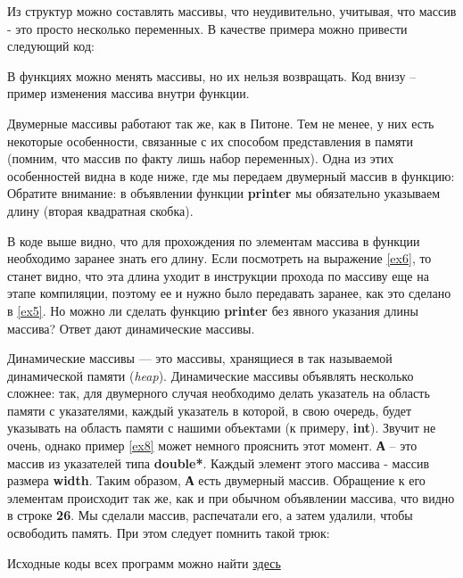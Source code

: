 \begin{lecture}[\lectureSubject]
\begin{lecSection}[Структуры в C++]
		Из структур можно составлять массивы, что неудивительно, учитывая, что массив - это просто несколько переменных. В качестве примера можно привести следующий код: \newpage
	\end{lecSection}
	\begin{lecSection}
		В функциях можно менять массивы, но их нельзя возвращать. Код внизу -- пример изменения массива внутри функции. \newpage
	\end{lecSection}
	\begin{lecSection} 
		Двумерные массивы работают так же, как в Питоне. Тем не менее, у них есть некоторые особенности, связанные с их способом представления в памяти (помним, что массив по факту лишь набор переменных). Одна из этих особенностей видна в коде ниже, где мы передаем двумерный массив в функцию:
		Обратите внимание: в объявлении функции \textbf{printer} мы обязательно указываем длину (вторая квадратная скобка).
	\end{lecSection}
	\begin{lecSection}
		В коде выше видно, что для прохождения по элементам массива в функции  необходимо заранее знать его длину. Если посмотреть на выражение \ref{ex6}, то станет видно, что эта длина уходит в инструкции прохода по массиву еще на этапе компиляции, поэтому ее и нужно было передавать заранее, как это сделано в \ref{ex5}. Но можно ли сделать функцию \textbf{printer} без явного указания длины массива? Ответ дают динамические массивы.
	\end{lecSection}
	\begin{lecSection}
		Динамические массивы --- это массивы, хранящиеся в так называемой динамической памяти (\textit{heap}). Динамические массивы объявлять несколько сложнее: так, для двумерного случая необходимо делать указатель на область памяти с указателями, каждый указатель в которой, в свою очередь, будет указывать на область памяти с нашими объектами (к примеру, \textbf{int}). Звучит не очень, однако пример \ref{ex8} может немного прояснить этот момент.
		\textbf{А} -- это массив из указателей типа \textbf{double*}. Каждый элемент этого массива - массив размера \textbf{width}. Таким образом, \textbf{А} есть двумерный массив. Обращение к его элементам происходит так же, как и при обычном объявлении массива, что видно в строке \textbf{26}.
		Мы сделали массив, распечатали его, а затем удалили, чтобы освободить память. При этом следует помнить такой трюк:
	\end{lecSection}
		\begin{center}
			{Исходные коды всех программ можно найти \href{https://github.com/alekseik1/cpp\_lections\_2017/tree/master/lection\%204}{здесь}}
		\end{center}
\end{lecture}
